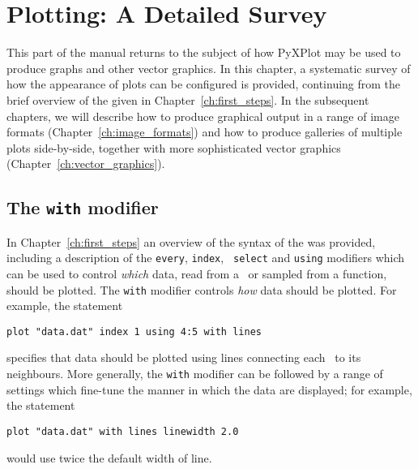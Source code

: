%
%
%
%
%



\chapter{Plotting: A Detailed Survey}
\label{ch:plotting}

This part of the manual returns to the subject of how PyXPlot may be used to
produce graphs and other vector graphics. In this chapter, a systematic survey
of how the appearance of plots can be configured is provided, continuing from
the brief overview of the  given in Chapter~\ref{ch:first_steps}.
In the subsequent chapters, we will describe how to produce graphical output in
a range of image formats (Chapter~\ref{ch:image_formats}) and how to produce
galleries of multiple plots side-by-side, together with more sophisticated
vector graphics (Chapter~\ref{ch:vector_graphics}).

\section{The {\tt with} modifier}
\label{sec:with_modifier}

In Chapter~\ref{ch:first_steps} an overview of the syntax of the 
was provided, including a description of the {\tt every}, {\tt index}, {\tt
select} and {\tt using} modifiers which can be used to control {\it which}
data, read from a \datafile\ or sampled from a function, should be plotted. The
{\tt with} modifier controls {\it how} data should be plotted. For example, the
statement
\begin{verbatim}
plot "data.dat" index 1 using 4:5 with lines
\end{verbatim}
specifies that data should be plotted using lines connecting each \datapoint\ to
its neighbours. More generally, the {\tt with} modifier can be followed by a
range of settings which fine-tune the manner in which the data are displayed;
for example, the statement
\begin{verbatim}
plot "data.dat" with lines linewidth 2.0
\end{verbatim}
would use twice the default width of line.

